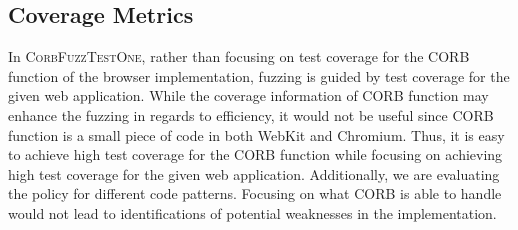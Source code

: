 \documentclass[10pt,conference]{IEEEtran}
\begin{document}


\subsection{Coverage Metrics}
In \textsc{CorbFuzzTestOne}, rather than focusing on test coverage for the CORB function of the browser implementation, fuzzing is guided by test coverage for the given web application. While the coverage information of CORB function may enhance the fuzzing in regards to efficiency, it would not be useful since CORB function is a small piece of code in both WebKit and Chromium. Thus, it is easy to achieve high test coverage for the CORB function while focusing on achieving high test coverage for the given web application. Additionally, we are evaluating the policy for different code patterns. Focusing on what CORB is able to handle would not lead to identifications of potential weaknesses in the implementation. %
\end{document}

